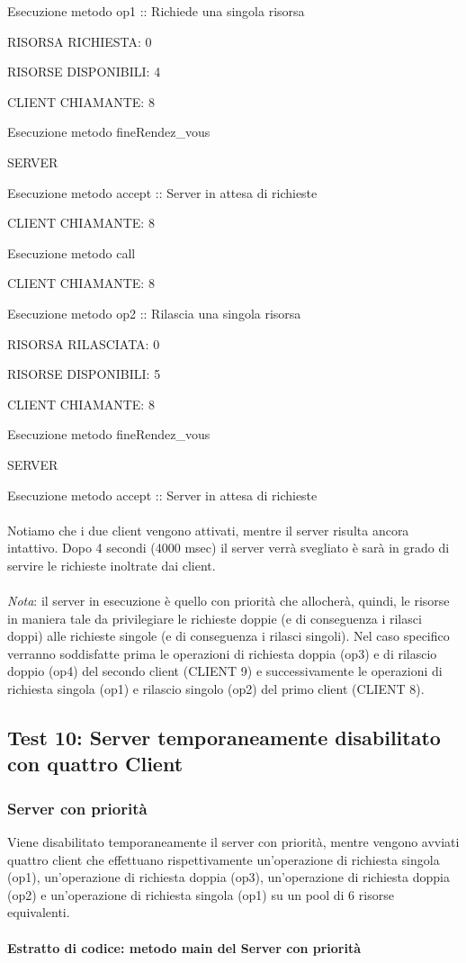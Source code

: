 \documentclass[10pt, a4paper]{article}
\begin{document}
Esecuzione metodo op1 :: Richiede una singola risorsa

RISORSA RICHIESTA: 0

RISORSE DISPONIBILI: 4

CLIENT CHIAMANTE: 8

Esecuzione metodo fineRendez\_vous

SERVER

Esecuzione metodo accept :: Server in attesa di richieste

CLIENT CHIAMANTE: 8

Esecuzione metodo call

CLIENT CHIAMANTE: 8

Esecuzione metodo op2 :: Rilascia una singola risorsa

RISORSA RILASCIATA: 0

RISORSE DISPONIBILI: 5

CLIENT CHIAMANTE: 8

Esecuzione metodo fineRendez\_vous

SERVER

Esecuzione metodo accept :: Server in attesa di richieste
\\\\
Notiamo che i due client vengono attivati, mentre il server risulta ancora intattivo. Dopo 4 secondi (4000 msec) il server verrà svegliato è sarà in grado di servire le richieste inoltrate dai client. 
\\\\
\textit{Nota}: il server in esecuzione è quello con priorità che allocherà, quindi, le risorse in maniera tale da privilegiare le richieste doppie (e di conseguenza i rilasci doppi) alle richieste singole (e di conseguenza i rilasci singoli). Nel caso specifico verranno soddisfatte prima le operazioni di richiesta doppia (op3) e di rilascio doppio (op4) del secondo client (CLIENT 9) e successivamente le operazioni di richiesta singola (op1) e rilascio singolo (op2) del primo client (CLIENT 8).
\subsection{Test 10: Server temporaneamente disabilitato con quattro Client}
\subsubsection{Server con priorità}
Viene disabilitato temporaneamente il server con priorità, mentre vengono avviati quattro client che effettuano rispettivamente un'operazione di richiesta singola (op1), un'operazione di richiesta doppia (op3), un'operazione di richiesta doppia (op2) e un'operazione di richiesta singola (op1) su un pool di 6 risorse equivalenti.
\\\\
\textbf{Estratto di codice: metodo main del Server con priorità}
\\
\end{document}
